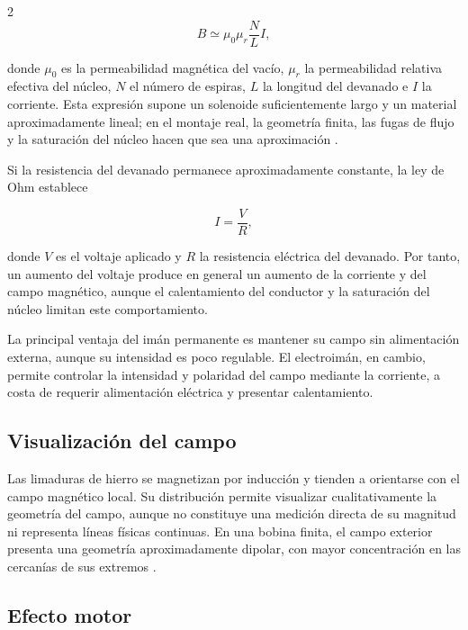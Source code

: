 \documentclass[10pt,letterpaper]{article}
\begin{document}
\begin{multicols}{2}
\begin{equation}
  B \simeq \mu_0\mu_r\frac{N}{L}I,
  \label{eq:solenoide}
\end{equation}

donde $\mu_0$ es la permeabilidad magnética del vacío, $\mu_r$ la permeabilidad relativa efectiva del núcleo, $N$ el número de espiras, $L$ la longitud del devanado e $I$ la corriente. Esta expresión supone un solenoide suficientemente largo y un material aproximadamente lineal; en el montaje real, la geometría finita, las fugas de flujo y la saturación del núcleo hacen que sea una aproximación \cite{griffiths2017}.

Si la resistencia del devanado permanece aproximadamente constante, la ley de Ohm establece

\begin{equation}
  I=\frac{V}{R},
  \label{eq:ohm}
\end{equation}

donde $V$ es el voltaje aplicado y $R$ la resistencia eléctrica del devanado. Por tanto, un aumento del voltaje produce en general un aumento de la corriente y del campo magnético, aunque el calentamiento del conductor y la saturación del núcleo limitan este comportamiento.

La principal ventaja del imán permanente es mantener su campo sin alimentación externa, aunque su intensidad es poco regulable. El electroimán, en cambio, permite controlar la intensidad y polaridad del campo mediante la corriente, a costa de requerir alimentación eléctrica y presentar calentamiento.

\subsection{Visualización del campo}

Las limaduras de hierro se magnetizan por inducción y tienden a orientarse con el campo magnético local. Su distribución permite visualizar cualitativamente la geometría del campo, aunque no constituye una medición directa de su magnitud ni representa líneas físicas continuas. En una bobina finita, el campo exterior presenta una geometría aproximadamente dipolar, con mayor concentración en las cercanías de sus extremos \cite{griffiths2017}.

\subsection{Efecto motor}


\end{multicols}
\end{document}
